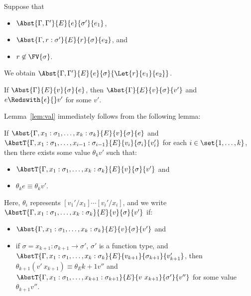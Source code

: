 \begin{lemma}
\label{lem:subb}
Suppose that
\begin{itemize}
\item $\Abst{\Gamma,\Gamma'}{E}{e}{\sigma'}{e_1}$,
\item $\Abst{\Gamma,r:\sigma'}{E}{r}{\sigma}{e_2}$, and
\item $r \not\in \FV{\sigma}$.
\end{itemize}
We obtain $\Abst{\Gamma,\Gamma'}{E}{e}{\sigma}{\Let{r}{e_1}{e_2}}$.
\end{lemma}

\begin{lemma}
\label{lem:val}
If $\Abst{\Gamma}{E}{v}{\sigma}{e}$, then $\Abst{\Gamma}{E}{v}{\sigma}{v'}$ and
$e \Redswith{\epsilon}{} v'$ for some $v'$.
\end{lemma}

Lemma~\ref{lem:val} immediately follows from the following lemma:

\begin{lemma}
\label{lem:val_aux}
If $\Abst{\Gamma,x_1:\sigma_1,\dots,x_k:\sigma_k}{E}{v}{\sigma}{e}$ and
$\AbstT{\Gamma,x_1:\sigma_1,\dots,x_{i-1}:\sigma_{i-1}}{E}{v_i}{\sigma_i}{v_i'}$ for each $i \in \set{1,\dots,k}$, then
there exists some value $\theta_k v'$ such that:
\begin{itemize}
\item $\AbstT{\Gamma,x_1:\sigma_1,\dots,x_k:\sigma_k}{E}{v}{\sigma}{v'}$ and
\item $\theta_k e \equiv \theta_k v'$.
\end{itemize}
Here, $\theta_i$ represents $[v_1'/x_1]\cdots[v_i'/x_i]$, and we
write $\AbstT{\Gamma,x_1:\sigma_1,\dots,x_k:\sigma_k}{E}{v}{\sigma}{v'}$ if:
\begin{itemize}
\item $\Abst{\Gamma,x_1:\sigma_1,\dots,x_k:\sigma_k}{E}{v}{\sigma}{v'}$ and
\item if $\sigma=x_{k+1}:\sigma_{k+1} \to \sigma'$,
$\sigma'$ is a function type, and
$\AbstT{\Gamma,x_1:\sigma_1,\dots,x_k:\sigma_k}{E}{v_{k+1}}{\sigma_{k+1}}{v_{k+1}'}$, then
$\theta_{k+1} (v'\ x_{k+1}) \equiv \theta_{E}{k+1} v''$ and
$\AbstT{\Gamma,x_1:\sigma_1,\dots,x_{k+1}:\sigma_{k+1}}{E}{v\ x_{k+1}}{\sigma'}{v''}$
for some value $\theta_{k+1} v''$.
\end{itemize}
\end{lemma}

